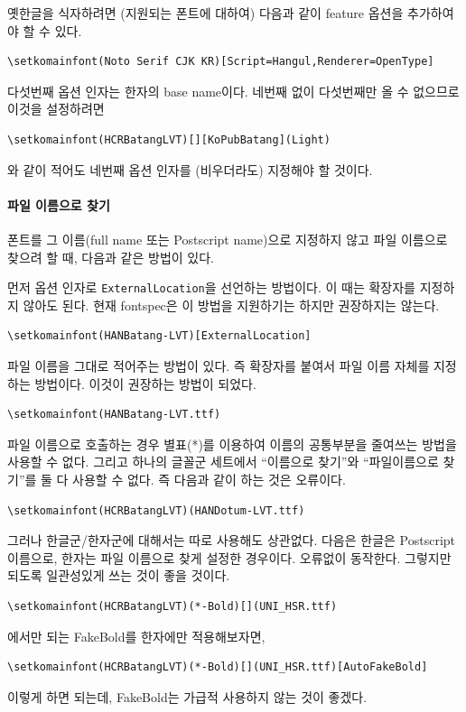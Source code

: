 \documentclass[
	12pt,
	a4paper,
	kosection,
	footnote,
	nobookmarks,
	microtype,
	figtabcapt,
]{oblivoir}
\begin{document}
옛한글을 식자하려면 (지원되는 폰트에 대하여) 다음과 같이 feature 옵션을 추가하여야 할 수 있다.
\begin{verbatim}
\setkomainfont(Noto Serif CJK KR)[Script=Hangul,Renderer=OpenType]
\end{verbatim}

다섯번째 옵션 인자는 한자의 base name이다. 네번째 없이 다섯번째만 올 수 없으므로 이것을
설정하려면
\begin{verbatim}
\setkomainfont(HCRBatangLVT)[][KoPubBatang](Light)
\end{verbatim}
와 같이 적어도 네번째 옵션 인자를 (비우더라도) 지정해야 할 것이다.

\paragraph{파일 이름으로 찾기}
폰트를 그 이름(full name 또는 Postscript name)으로 지정하지 않고 파일 이름으로 찾으려 할 때,
다음과 같은 방법이 있다.

먼저 옵션 인자로 \texttt{ExternalLocation}을 선언하는 방법이다. 이 때는 확장자를 지정하지 않아도 된다. 현재 \textsf{fontspec}은 이 방법을 지원하기는 하지만 권장하지는 않는다.
\begin{verbatim}
\setkomainfont(HANBatang-LVT)[ExternalLocation]
\end{verbatim}
파일 이름을 그대로 적어주는 방법이 있다. 즉 확장자를 붙여서 파일 이름 자체를 지정하는 방법이다. 이것이 권장하는 방법이 되었다.
\begin{verbatim}
\setkomainfont(HANBatang-LVT.ttf)
\end{verbatim}

파일 이름으로 호출하는 경우 별표(*)를 이용하여 이름의 공통부분을 줄여쓰는 방법을 사용할 수 없다.
그리고 
하나의 글꼴군 세트에서 ``이름으로 찾기''와 ``파일이름으로 찾기''를 둘 다 사용할 수 없다. 즉 다음과 같이 하는 것은 오류이다.
\begin{verbatim}
\setkomainfont(HCRBatangLVT)(HANDotum-LVT.ttf)
\end{verbatim}
그러나 한글군/한자군에 대해서는 따로 사용해도 상관없다. 다음은 한글은 Postscript 이름으로,
한자는 파일 이름으로 찾게 설정한 경우이다. 오류없이 동작한다. 그렇지만 되도록 일관성있게 쓰는 것이 좋을 것이다.
\begin{verbatim}
\setkomainfont(HCRBatangLVT)(*-Bold)[](UNI_HSR.ttf)
\end{verbatim}
\XeTeX 에서만 되는 FakeBold를 한자에만 적용해보자면,
\begin{verbatim}
\setkomainfont(HCRBatangLVT)(*-Bold)[](UNI_HSR.ttf)[AutoFakeBold]
\end{verbatim}
이렇게 하면 되는데, FakeBold는 가급적 사용하지 않는 것이 좋겠다.
\end{document}
